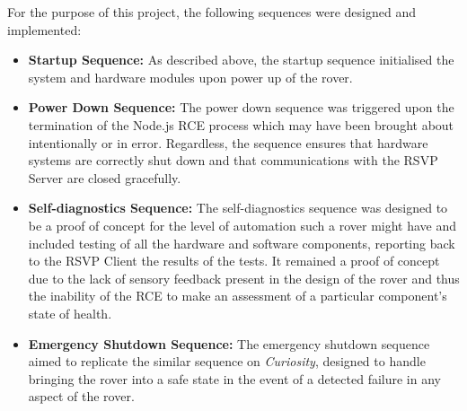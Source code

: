           For the purpose of this project, the following sequences were designed and implemented:
          \begin{itemize}
            \item \textbf{Startup Sequence:} As described above, the startup sequence initialised the system and hardware modules upon power up of the rover.
            \item \textbf{Power Down Sequence:} The power down sequence was triggered upon the termination of the Node.js RCE process which may have been brought about intentionally or in error. Regardless, the sequence ensures that hardware systems are correctly shut down and that communications with the RSVP Server are closed gracefully. 
            \item \textbf{Self-diagnostics Sequence:} The self-diagnostics sequence was designed to be a proof of concept for the level of automation such a rover might have and included testing of all the hardware and software components, reporting back to the RSVP Client the results of the tests. It remained a proof of concept due to the lack of sensory feedback present in the design of the rover and thus the inability of the RCE to make an assessment of a particular component's state of health.
            \item \textbf{Emergency Shutdown Sequence:} The emergency shutdown sequence aimed to replicate the similar sequence on \textit{Curiosity}, designed to handle bringing the rover into a safe state in the event of a detected failure in any aspect of the rover.
          \end{itemize}
          
